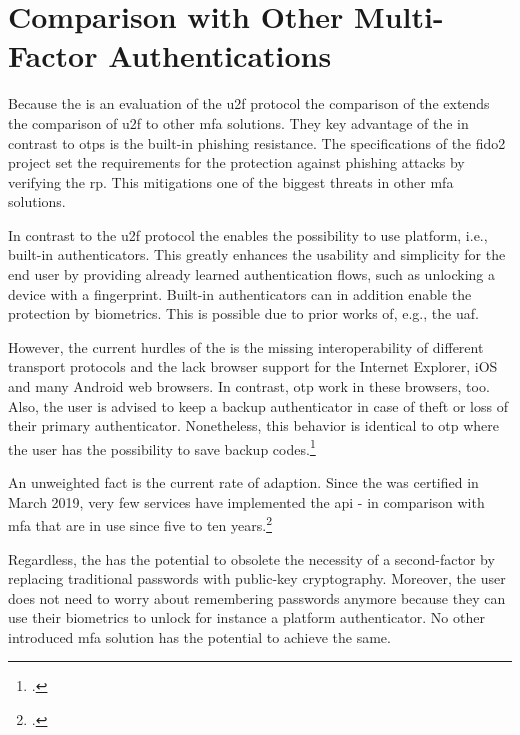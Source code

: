 \section{Comparison with Other Multi-Factor Authentications}
\label{chapter:comparison}

Because the \wa{} is an evaluation of the \gls{u2f} protocol the comparison of the \wa{} extends the comparison of \gls{u2f} to other \gls{mfa} solutions. They key advantage of the \wa{} in contrast to \glspl{otp} is the built-in phishing resistance. The specifications of the \gls{fido}2 project set the requirements for the protection against phishing attacks by verifying the \gls{rp}. This mitigations one of the biggest threats in other \gls{mfa} solutions.

In contrast to the \gls{u2f} protocol the \wa{} enables the possibility to use platform, i.e., built-in authenticators. This greatly enhances the usability and simplicity for the end user by providing already learned authentication flows, such as unlocking a device with a fingerprint. Built-in authenticators can in addition enable the protection by biometrics. This is possible due to prior works of, e.g., the \gls{uaf}.

 However, the current hurdles of the \wa{} is the missing interoperability of different transport protocols and the lack browser support for the Internet Explorer, iOS and many Android web browsers. In contrast, \gls{otp} work in these browsers, too. Also, the user is advised to keep a backup authenticator in case of theft or loss of their primary authenticator. Nonetheless, this behavior is identical to \gls{otp} where the user has the possibility to save backup codes.\footcites[See][36]{10.1007/978-3-319-45931-8_3}
 
An unweighted fact is the current rate of adaption. Since the \wa was certified in March 2019, very few services have implemented the \gls{api} - in comparison with \gls{mfa} that are in use since five to ten years.\footcites[See][]{works-with-yubico}
 
Regardless, the \wa{} has the potential to obsolete the necessity of a second-factor by replacing traditional passwords with public-key cryptography. Moreover, the user does not need to worry about remembering passwords anymore because they can use their biometrics to unlock for instance a platform authenticator. No other introduced \gls{mfa} solution has the potential to achieve the same.
